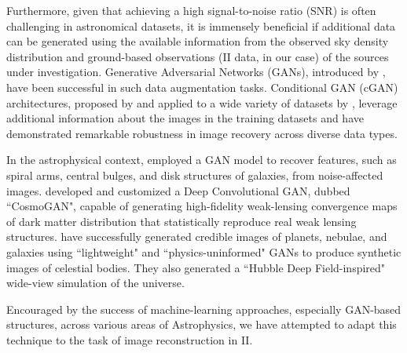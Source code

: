 Furthermore, given that achieving a high signal-to-noise ratio (SNR) is often challenging in astronomical datasets, it is immensely beneficial if additional data can be generated using the available information from the observed sky density distribution and ground-based observations (II data, in our case) of the sources under investigation. Generative Adversarial Networks (GANs), introduced by \cite{goodfellow2014generative}, have been successful in such data augmentation tasks. Conditional GAN (cGAN) architectures, proposed by \cite{mirza2014conditional} and applied to a wide variety of datasets by \cite{isola2017image}, leverage additional information about the images in the training datasets and have demonstrated remarkable robustness in image recovery across diverse data types.

In the astrophysical context, \cite{schawinski2017galaxypics} employed a GAN model to recover features, such as spiral arms, central bulges, and disk structures of galaxies, from noise-affected images. \cite{mustafa2019cosmogan} developed and customized a Deep Convolutional GAN, dubbed ``CosmoGAN", capable of generating high-fidelity weak-lensing convergence maps of dark matter distribution that statistically reproduce real weak lensing structures. \cite{coccomini2021lightweightgan} have successfully generated credible images of planets, nebulae, and galaxies using ``lightweight" and ``physics-uninformed" GANs to produce synthetic images of celestial bodies. They also generated a ``Hubble Deep Field-inspired" wide-view simulation of the universe. 

Encouraged by the success of machine-learning approaches, especially GAN-based structures, across various areas of Astrophysics, we have attempted to adapt this technique to the task of image reconstruction in II. 

